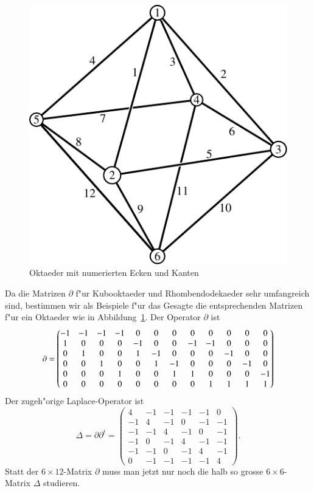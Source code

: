 \documentclass[a4paper,12pt]{article}
\begin{document}
\begin{figure}
\centering
\includegraphics{../aufgaben/1/10000028/octahedron-1.pdf}
\caption{Oktaeder mit numerierten Ecken und Kanten
\label{oktaeder-kanten}}
\end{figure}
Da die Matrizen $\partial$ f"ur Kubooktaeder und Rhombendodekaeder
sehr umfangreich sind, bestimmen wir als Beispiele f"ur das Gesagte
die entsprechenden Matrizen f"ur ein Oktaeder wie in
Abbildung~\ref{oktaeder-kanten}.
Der Operator $\partial$ ist
\[
\setcounter{MaxMatrixCols}{20}
\partial=\begin{pmatrix}
-1& -1&-1&-1& 0& 0& 0& 0& 0& 0& 0& 0\\ %
 1&  0& 0& 0&-1& 0& 0&-1&-1& 0& 0& 0\\ %
 0&  1& 0& 0& 1&-1& 0& 0& 0&-1& 0& 0\\ %
 0&  0& 1& 0& 0& 1&-1& 0& 0& 0&-1& 0\\ %
 0&  0& 0& 1& 0& 0& 1& 1& 0& 0& 0&-1\\ %
 0&  0& 0& 0& 0& 0& 0& 0& 1& 1& 1& 1   %
\end{pmatrix}
\]
Der zugeh"orige Laplace-Operator ist
\[
\Delta=\partial\partial^t
=\begin{pmatrix}
   4& -1& -1& -1& -1&  0\\
  -1&  4& -1&  0& -1& -1\\
  -1& -1&  4& -1&  0& -1\\
  -1&  0& -1&  4& -1& -1\\
  -1& -1&  0& -1&  4& -1\\
   0& -1& -1& -1& -1&  4
\end{pmatrix}.
\]
Statt der $6\times 12$-Matrix  $\partial$ muss man jetzt nur noch
die halb so grosse $6\times 6$-Matrix $\Delta$ studieren.
\end{document}
